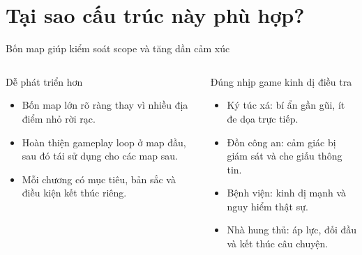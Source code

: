 \documentclass[aspectratio=169,10pt]{beamer}
\begin{document}
\section{Tại sao cấu trúc này phù hợp?}
\begin{frame}{Bốn map giúp kiểm soát scope và tăng dần cảm xúc}
  \begin{columns}[T,onlytextwidth]
    \begin{block}{Dễ phát triển hơn}
      \begin{itemize}
        \item Bốn map lớn rõ ràng thay vì nhiều địa điểm nhỏ rời rạc.
        \item Hoàn thiện gameplay loop ở map đầu, sau đó tái sử dụng cho các map sau.
        \item Mỗi chương có mục tiêu, bản sắc và điều kiện kết thúc riêng.
      \end{itemize}
    \end{block}
    \begin{block}{Đúng nhịp game kinh dị điều tra}
      \begin{itemize}
        \item Ký túc xá: bí ẩn gần gũi, ít đe dọa trực tiếp.
        \item Đồn công an: cảm giác bị giám sát và che giấu thông tin.
        \item Bệnh viện: kinh dị mạnh và nguy hiểm thật sự.
        \item Nhà hung thủ: áp lực, đối đầu và kết thúc câu chuyện.
      \end{itemize}
    \end{block}
  \end{columns}
\end{frame}
\end{document}
